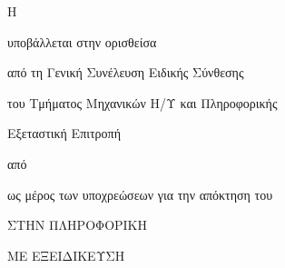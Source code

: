 \makeatletter

{\LARGE \@titleGr}

{\Large
    \vfill \vfill Η \csethesisTypeGr

    \vfill        υποβάλλεται στην ορισθείσα

                  από τη Γενική Συνέλευση Ειδικής Σύνθεσης

                  του Τμήματος Μηχανικών Η/Υ και Πληροφορικής

                  Εξεταστική Επιτροπή

    \vfill        από \@arthro

    \vfill        {\LARGE \@aitiatiki}

    \vfill        ως μέρος των υποχρεώσεων για την απόκτηση του

    \vfill        \MakeUppercase{\csediplwmaGr}

    \ifPhD\else   ΣΤΗΝ ΠΛΗΡΟΦΟΡΙΚΗ

    \vspace{1em}  ΜΕ ΕΞΕΙΔΙΚΕΥΣΗ

                  \ekseidikseusiGr
    \fi

    \vfill \vfill \@dateGr
}

\makeatother
\clearpage
